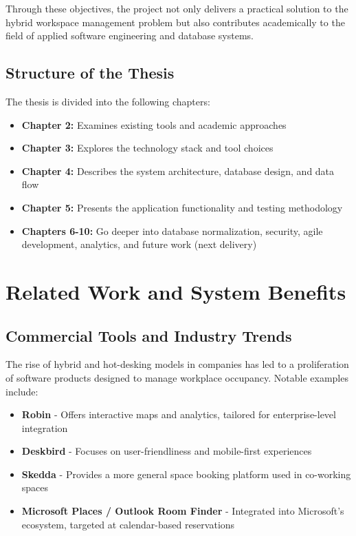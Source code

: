 \documentclass[12pt,a4paper]{report}
\begin{document}
Through these objectives, the project not only delivers a practical solution to the hybrid workspace management problem but also contributes academically to the field of applied software engineering and database systems.

\section{Structure of the Thesis}

The thesis is divided into the following chapters:
\begin{itemize}
    \item \textbf{Chapter 2:} Examines existing tools and academic approaches
    \item \textbf{Chapter 3:} Explores the technology stack and tool choices
    \item \textbf{Chapter 4:} Describes the system architecture, database design, and data flow
    \item \textbf{Chapter 5:} Presents the application functionality and testing methodology
    \item \textbf{Chapters 6-10:} Go deeper into database normalization, security, agile development, analytics, and future work (next delivery)
\end{itemize}

\newpage

\chapter{Related Work and System Benefits}

\section{Commercial Tools and Industry Trends}

The rise of hybrid and hot-desking models in companies has led to a proliferation of software products designed to manage workplace occupancy. Notable examples include:
\begin{itemize}
    \item \textbf{Robin} - Offers interactive maps and analytics, tailored for enterprise-level integration
    \item \textbf{Deskbird} - Focuses on user-friendliness and mobile-first experiences
    \item \textbf{Skedda} - Provides a more general space booking platform used in co-working spaces
    \item \textbf{Microsoft Places / Outlook Room Finder} - Integrated into Microsoft's ecosystem, targeted at calendar-based reservations
\end{itemize}
\end{document}
